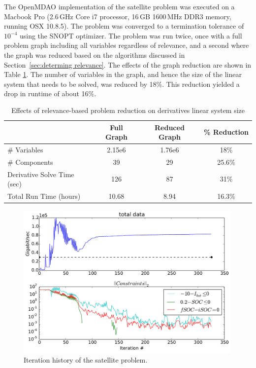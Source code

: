 \documentclass[]{aiaa-tc} %
\begin{document}
            The OpenMDAO implementation of the satellite problem was executed on a
            Macbook Pro (2.6\,GHz Core i7 processor, 16\,GB 1600\,MHz DDR3 memory, running OSX 10.8.5).
            The problem was converged to a termination tolerance of $10^{-4}$ using the SNOPT\cite{gill2005snopt} optimizer.
            The problem was run twice, once with a full problem graph including all variables regardless of relevance,
            and a second where the graph was reduced based on the algorithms discussed in Section~\ref{sec:determing relevance}.
            The effects of the graph reduction are shown in Table \ref{tab:cadre-relevance-reduction}. The number of variables in
            the graph, and hence the size of the linear system that needs to be solved, was reduced by 18\%. This reduction
            yielded a drop in runtime of about 16\%.


            \begin{table}
                \centering
                \caption{Effects of relevance-based problem reduction on derivatives linear system size}
                  \begin{tabular}{l c c c}
                      \toprule
                                   & Full Graph & Reduced Graph & \% Reduction\\
                      \midrule
                      \# Variables  & 2.15e6 & 1.76e6 & 18\%\\
                      \# Components & 39 & 29 & 25.6\%\\
                      Derivative Solve Time (sec) & 126 & 87 & 31\%\\
                      Total Run Time (hours) & 10.68 & 8.94 & 16.3\%\\
                      \bottomrule
                  \end{tabular}
                \label{tab:cadre-relevance-reduction}
            \end{table}


            \begin{figure}[!htb]
            \centering
            \includegraphics[width=0.99\textwidth]{images/cadre_opt_progress}
            \caption[width=0.22\textwidth]{Iteration history of the satellite problem.
            \label{convergence}
            }
            \end{figure}
\end{document}

